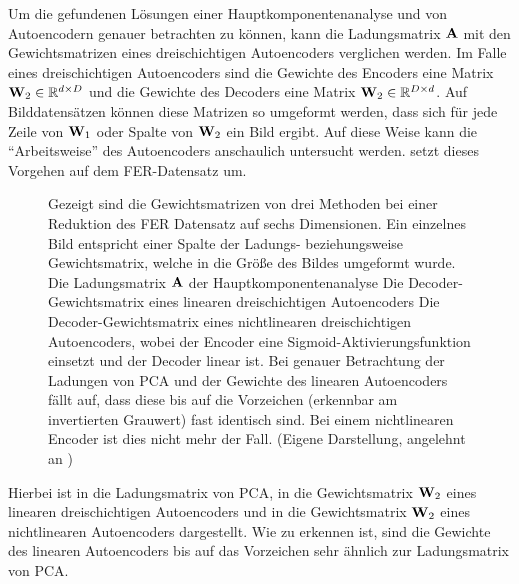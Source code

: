 Um die gefundenen Lösungen einer Hauptkomponentenanalyse und von Autoencodern genauer betrachten zu
können, kann die Ladungsmatrix $\mathbf{A}$ mit den Gewichtsmatrizen eines dreischichtigen
Autoencoders verglichen werden. Im Falle eines dreischichtigen Autoencoders sind die Gewichte des
Encoders eine Matrix $\mathbf{W}_2 \in \mathbb{R}^{d \times D}$ und die Gewichte des Decoders eine Matrix
$\mathbf{W}_2 \in \mathbb{R}^{D \times d}$. Auf Bilddatensätzen können diese Matrizen so umgeformt werden,
dass sich für jede Zeile von $\mathbf{W}_1$ oder Spalte von $\mathbf{W}_2$ ein Bild ergibt. Auf diese
Weise kann die \enquote{Arbeitsweise} des Autoencoders anschaulich untersucht werden.
 setzt dieses Vorgehen auf dem FER-Datensatz um.
\begin{figure}[ht]
	\centering
	
	\caption[Die Gewichtsmatrizen von ausgewählten Methoden auf dem FER Datensatz]{Gezeigt sind die Gewichtsmatrizen von drei Methoden bei einer Reduktion des FER Datensatz auf sechs Dimensionen. Ein einzelnes Bild entspricht einer Spalte der Ladungs- beziehungsweise Gewichtsmatrix, welche in die Größe des Bildes umgeformt wurde. \captiona Die Ladungsmatrix $\mathbf{A}$ der Hauptkomponentenanalyse \captionb Die Decoder-Gewichtsmatrix eines linearen dreischichtigen Autoencoders \captionc Die Decoder-Gewichtsmatrix eines nichtlinearen dreischichtigen Autoencoders, wobei der Encoder eine Sigmoid-Aktivierungsfunktion einsetzt und der Decoder linear ist.
		Bei genauer Betrachtung der Ladungen von PCA und der Gewichte des linearen Autoencoders fällt auf, dass diese bis auf die Vorzeichen (erkennbar am invertierten Grauwert) fast identisch sind. Bei einem nichtlinearen Encoder ist dies nicht mehr der Fall. (Eigene Darstellung, angelehnt an \textcite[5]{Plaut.2018})}
	\label{fig:Gewichtsvergleich}
\end{figure}
Hierbei ist in \captiona die Ladungsmatrix von PCA, in \captionb die Gewichtsmatrix $\mathbf{W}_2$ eines linearen dreischichtigen Autoencoders und in \captionc die Gewichtsmatrix $\mathbf{W}_2$ eines nichtlinearen Autoencoders dargestellt. Wie zu erkennen ist, sind
die Gewichte des linearen Autoencoders bis auf das Vorzeichen sehr ähnlich zur Ladungsmatrix von
PCA.